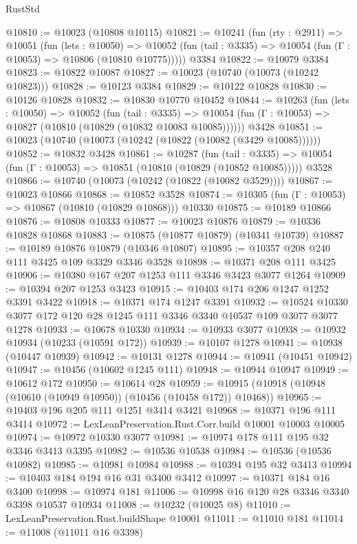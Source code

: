 \begin{lexlean}{RustStd}
\begin{coremodule}
@10810 := @10023 (@10808 @10115)
@10821 := @10241
    (fun (rty : @2911) =>
    @10051
      (fun (lets : @10050) =>
      @10052 (fun (tail : @3335) => @10054 (fun (Γ : @10053) => @10806 (@10810 @10775)))))
    @3384
@10822 := @10079 @3384
@10823 := @10822 @10087
@10827 := @10023 (@10740 (@10073 (@10242 @10823)))
@10828 := @10123 @3384
@10829 := @10122 @10828
@10830 := @10126 @10828
@10832 := @10830 @10770 @10452
@10844 := @10263
    (fun (lets : @10050) =>
    @10052
      (fun (tail : @3335) =>
      @10054 (fun (Γ : @10053) => @10827 (@10810 (@10829 (@10832 @10083 @10085))))))
    @3428
@10851 := @10023 (@10740 (@10073 (@10242 (@10822 (@10082 (@3429 @10085))))))
@10852 := @10832 @3428
@10861 := @10287
    (fun (tail : @3335) => @10054 (fun (Γ : @10053) => @10851 (@10810 (@10829 (@10852 @10085)))))
    @3528
@10866 := @10740 (@10073 (@10242 (@10822 (@10082 @3529))))
@10867 := @10023 @10866
@10868 := @10852 @3528
@10874 := @10305 (fun (Γ : @10053) => @10867 (@10810 (@10829 @10868))) @10330
@10875 := @10189 @10866
@10876 := @10808 @10333
@10877 := @10023 @10876
@10879 := @10336 @10828 @10868
@10883 := @10875 (@10877 @10879) (@10341 @10739)
@10887 := @10189 @10876 @10879 (@10346 @10807)
@10895 := @10357 @208 @240 @111 @3425 @109 @3329 @3346 @3528
@10898 := @10371 @208 @111 @3425
@10906 := @10380 @167 @207 @1253 @111 @3346 @3423 @3077 @1264
@10909 := @10394 @207 @1253 @3423
@10915 := @10403 @174 @206 @1247 @1252 @3391 @3422
@10918 := @10371 @174 @1247 @3391
@10932 := @10524 @10330 @3077 @172 @120 @28 @1245 @111 @3346 @3340 @10537 @109 @3077 @3077 @1278
@10933 := @10678 @10330
@10934 := @10933 @3077
@10938 := @10932 @10934 (@10233 (@10591 @172))
@10939 := @10107 @1278
@10941 := @10938 (@10447 @10939)
@10942 := @10131 @1278
@10944 := @10941 (@10451 @10942)
@10947 := @10456 (@10602 @1245 @111)
@10948 := @10944 @10947
@10949 := @10612 @172
@10950 := @10614 @28
@10959 := @10915 (@10918 (@10948 (@10610 (@10949 @10950)) (@10456 (@10458 @172)) @10468))
@10965 := @10403 @196 @205 @111 @1251 @3414 @3421
@10968 := @10371 @196 @111 @3414
@10972 := LexLeanPreservation.Rust.Corr.build @10001 @10003 @10005
@10974 := @10972 @10330 @3077
@10981 := @10974 @178 @111 @195 @32 @3346 @3413 @3395
@10982 := @10536 @10538
@10984 := @10536 (@10536 @10982)
@10985 := @10981 @10984
@10988 := @10394 @195 @32 @3413
@10994 := @10403 @184 @194 @16 @31 @3400 @3412
@10997 := @10371 @184 @16 @3400
@10998 := @10974 @181
@11006 := @10998 @16 @120 @28 @3346 @3340 @3398 @10537 @10934
@11008 := @10232 (@10025 @8)
@11010 := LexLeanPreservation.Rust.buildShape @10001
@11011 := @11010 @181
@11014 := @11008 (@11011 @16 @3398)

\end{coremodule}
\end{lexlean}
